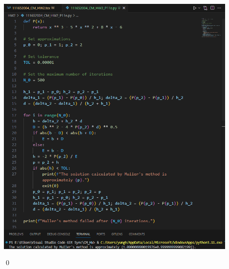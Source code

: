 \documentclass[11pt]{article}
\theoremstyle{break}
\numberwithin{equation}{theorem}
\begin{document}
\begin{enumerate}
\begin{center}
        \includegraphics[width=0.9\textwidth]{problem_11e_py.png}
    \end{center}
    \qed
\end{enumerate}
\end{document}
